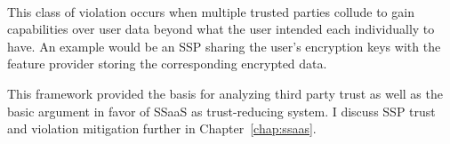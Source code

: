 \begin{packed_desc}
\item[Colluding (L):] \hfill \\ This class of violation occurs when
  multiple trusted parties collude to gain capabilities over user data
  beyond what the user intended each individually to have. An example
  would be an SSP sharing the user's encryption keys with the feature
  provider storing the corresponding encrypted data.
\end{packed_desc}

This framework provided the basis for analyzing third party trust as
well as the basic argument in favor of SSaaS as trust-reducing
system. I discuss SSP trust and violation mitigation further in
Chapter~\ref{chap:ssaas}.

